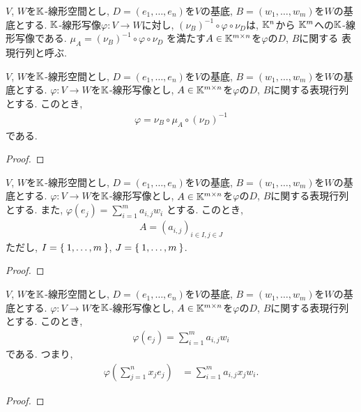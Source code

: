 \begin{definition}
  $V$, $W$を$\mathbb{K}$-線形空間とし,
  $D=(e_1,\ldots,e_n)$を$V$の基底,
  $B=(w_1,\ldots,w_m)$を$W$の基底とする.
  $\mathbb{K}$-線形写像$\varphi\colon V\to W$に対し,
  $(\nu_B)^{-1}\circ \varphi\circ \nu_D$は,
  $\mathbb{K}^n$から $\mathbb{K}^m$への$\mathbb{K}$-線形写像である.
  $\mu_A=(\nu_B)^{-1}\circ \varphi\circ \nu_D$
  を満たす$A\in\mathbb{K}^{m\times n}$を$\varphi$の$D$, $B$に関する
  表現行列と呼ぶ.
\end{definition}
\begin{prop}
  $V$, $W$を$\mathbb{K}$-線形空間とし,
  $D=(e_1,\ldots,e_n)$を$V$の基底,
  $B=(w_1,\ldots,w_m)$を$W$の基底とする.
  $\varphi\colon V\to W$を$\mathbb{K}$-線形写像とし,
  $A\in\mathbb{K}^{m\times n}$を$\varphi$の$D$, $B$に関する表現行列とする.
このとき,
\begin{align*}
  \varphi=\nu_B\circ \mu_A\circ (\nu_{D})^{-1}
\end{align*}
である.
\end{prop}
\begin{proof}\end{proof}

\begin{prop}
  $V$, $W$を$\mathbb{K}$-線形空間とし,
  $D=(e_1,\ldots,e_n)$を$V$の基底,
  $B=(w_1,\ldots,w_m)$を$W$の基底とする.
  $\varphi\colon V\to W$を$\mathbb{K}$-線形写像とし,
  $A\in\mathbb{K}^{m\times n}$を$\varphi$の$D$, $B$に関する表現行列とする.
  また,
  $\varphi(e_j)=\sum_{i=1}^m a_{i,j} w_i$
  とする.
  このとき,
\begin{align*}
  A=(a_{i,j})_{i\in I, j\in J}
\end{align*}
ただし,
$I=\Set{1,\ldots,m}$,
$J=\Set{1,\ldots,m}$.
\end{prop}
\begin{proof}\end{proof}


\begin{prop}
  $V$, $W$を$\mathbb{K}$-線形空間とし,
  $D=(e_1,\ldots,e_n)$を$V$の基底,
  $B=(w_1,\ldots,w_m)$を$W$の基底とする.
  $\varphi\colon V\to W$を$\mathbb{K}$-線形写像とし,
  $A\in\mathbb{K}^{m\times n}$を$\varphi$の$D$, $B$に関する表現行列とする.
このとき,
\begin{align*}
  \varphi(e_j)=\sum_{i=1}^m a_{i,j}w_i
\end{align*}
である.
つまり,
\begin{align*}
  \varphi(\sum_{j=1}^n x_j e_j)
  &=\sum_{i=1}^m a_{i,j}x_jw_i.
\end{align*}
\end{prop}
\begin{proof}\end{proof}


